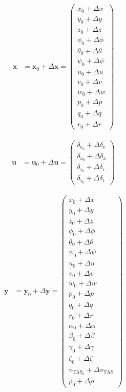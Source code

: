 \documentclass[lettersize,journal]{IEEEtran}
\begin{document}
{\begin{equation}
\begin{aligned}
\bm{x}&=\bm{x}_0+\Delta \bm{x}=\left(\begin{array}{c} x_0 + \Delta x\\ y_0 + \Delta y\\ z_0 + \Delta z\\ \phi_0 + \Delta \phi \\ \theta_0 + \Delta \theta \\ \psi_0 + \Delta \psi \\ u_0 + \Delta u\\ v_0 + \Delta v\\ w_0 + \Delta w\\ p_0 + \Delta p\\ q_0 + \Delta q\\ r_0 + \Delta r \end{array}\right)
\end{aligned}
\end{equation}

\begin{equation}
\begin{aligned}
\bm{u}&=\bm{u}_0+\Delta \bm{u}=\left(\begin{array}{c} \delta_{\mathrm{e}_0}+\Delta \delta_{\mathrm{e}}\\ \delta_{\mathrm{a}_0}+\Delta \delta_{\mathrm{a}}\\ \delta_{\mathrm{r}_0}+\Delta \delta_{\mathrm{r}}\\ \delta_{\mathrm{t}_0}+\Delta \delta_{\mathrm{t}} \end{array}\right)
\end{aligned}
\end{equation}

\begin{equation}
\begin{aligned}
\bm{y}&=\bm{y}_0+\Delta \bm{y}=\left(\begin{array}{c} x_0 + \Delta x\\ y_0 + \Delta y\\ z_0 + \Delta z\\ \phi_0 + \Delta \phi \\ \theta_0 + \Delta \theta \\ \psi_0 + \Delta \psi \\ u_0 + \Delta u\\ v_0 + \Delta v\\ w_0 + \Delta w\\ p_0 + \Delta p\\ q_0 + \Delta q\\ r_0 + \Delta r\\ \alpha_0 + \Delta \alpha \\ \beta_0 + \Delta \beta \\ \gamma_0 + \Delta \gamma \\ \zeta_0 + \Delta \zeta\\ v_{\mathrm{TAS}_0} + \Delta v_{\mathrm{TAS}}\\ \rho_0 + \Delta \rho  \end{array}\right)
\end{aligned}
\end{equation}

}
\end{document}
